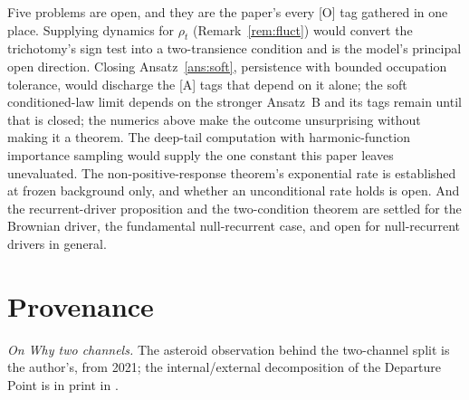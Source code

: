 Five problems are open, and they are the paper's every [O] tag
gathered in one place. Supplying dynamics for $\rho_t$
(Remark~\ref{rem:fluct}) would convert the trichotomy's sign test into
a two-transience condition and is the model's principal open
direction. Closing Ansatz~\ref{ans:soft}, persistence with bounded occupation tolerance, would discharge the [A] tags that depend on it alone; the soft conditioned-law limit depends on the stronger Ansatz~B and its tags remain until that is closed; the numerics
above make the outcome unsurprising without making it a theorem. The
deep-tail computation with harmonic-function importance sampling
would supply the one constant this paper leaves unevaluated. The
non-positive-response theorem's exponential rate is established at
frozen background only, and whether an unconditional rate holds is
open. And the recurrent-driver proposition and the two-condition
theorem are settled for the Brownian driver, the fundamental
null-recurrent case, and open for null-recurrent drivers in
general.


\section*{Provenance}

\noindent\textit{On Why two channels.} The asteroid observation behind the two-channel split is the author's, from 2021; the internal/external decomposition of the Departure Point is in print in \cite{GoldenScience2022}.

\printbibliography

